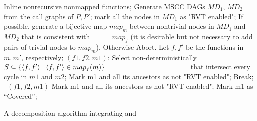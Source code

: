 \noindent
\begin{algorithm}
\begin{minipage}{\linewidth}
\begin{algorithmic}[1]
\State \label{step:inline} Inline nonrecursive nonmapped functions;
\State \label{step:generate} Generate MSCC DAGs $MD_1$, $MD_2$ from the call graphs of $P, P′$; 
\State \label{step:markEnabled} mark all the nodes in $MD_1$ as "RVT enabled";
\State If possible, generate a bijective map $map_m$ between nontrivial nodes in $MD_1$ and $MD_2$ that is consistent with \mbox{~~~~~} $map_f$ (it is desirable but not necessary to add pairs of trivial nodes to $map_m$). Otherwise Abort. 
 \label{step:whileOneSide}
 \label{step:findMapping}
    \label{step:m1}
     \State Let $f,f'$ be the functions in $m,m'$, respectively;
      \label{step:Check}
      $(f1, f2, m1)$; \label{step:markTrivial}
    \EndIf
   \Else
    \label{step:select} 
    \State Select non-deterministically $S \subseteq \{\langle f,f'\rangle\mid \langle f,f'\rangle\in map_f(m)\}$ \newline \mbox{~~~~~~~~~~~~~~~~~~~~~~~} that intersect every cycle in $m1$ and $m2$;
      \label{step:forall}
         \label{step:abort}
         \State Mark m1 and all its ancestors as not "RVT enabled"; \label{step:doom}
        \State Break;
        \EndIf
      \EndFor
       \label{step:markNonTrivial}
      \ {$(f1, f2, m1)$}
      \EndFor
      \EndIf
      \EndIf
      \Else
      \State Mark m1 and all its ancestors as not "RVT enabled";
      \EndIf
   \EndIf
   \State Mark m1 as “Covered”;
\EndWhile
\EndFunction
\end{algorithmic}
\end{minipage}
\caption{A decomposition algorithm integrating  and }
\label{alg:Prove}
\end{algorithm}
